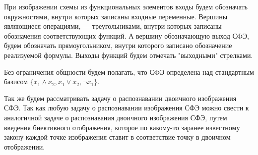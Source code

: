 \documentclass[makeidx, a4paper, 14pt]{extarticle}
\begin{document}
При изображении схемы из функциональных элементов входы будем обозначать окружностями, внутри которых записаны входные переменные.
Вершины являющиеся операциями, --- треугольниками, внутри которых записаны обозначения соответствующих функций. А вершину обозначающую
выход СФЭ, будем обозначать прямоугольником, внутри которого записано обозначение реализуемой формулы. Выходы функций будем отмечать "выходными" стрелками.

Без ограничения общности будем полагать, что СФЭ определена над стандартным базисом ${\{x_1 \wedge x_2, x_1 \vee x_2, \neg{x_1}\}}$.

Так же будем рассматривать задачу о распознавании двоичного изображения СФЭ.
Так как любую задачу о распознавании изображения СФЭ можно свести к аналогичной задаче о распознавания
двоичного изображения СФЭ, путем введения биективного отображения, которое по какому-то заранее известному
закону каждой точке изображения ставит в соответствие точку в двоичном отображении.
\end{document}
